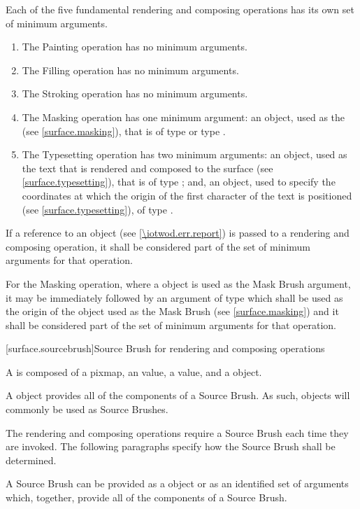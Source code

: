 \pnum
Each of the five fundamental rendering and composing operations has its own set of minimum arguments.
\begin{enumerate}
	\item The Painting operation has no minimum arguments.
	\item The Filling operation has no minimum arguments.
	\item The Stroking operation has no minimum arguments.
	\item The Masking operation has one minimum argument: an object, used as the  (see \ref{surface.masking}), that is of type  or type .
	\item The Typesetting operation has two minimum arguments: an object, used as the text that is rendered and composed to the surface (see \ref{surface.typesetting}), that is of type ; and, an object, used to specify the coordinates at which the origin of the first character of the text is positioned (see \ref{surface.typesetting}), of type .
\end{enumerate}

\pnum
If a reference to an  object (see \ref{\iotwod.err.report}) is passed to a rendering and composing operation, it shall be considered part of the set of minimum arguments for that operation.

\pnum
For the Masking operation, where a  object is used as the Mask Brush argument, it may be immediately followed by an argument of type  which shall be used as the origin of the  object used as the Mask Brush (see \ref{surface.masking}) and it shall be considered part of the set of minimum arguments for that operation.

 [surface.sourcebrush]{Source Brush for rendering and composing operations}

\pnum
A  is composed of a pixmap, an  value, a  value, and a  object.

\pnum
\enternote
A  object provides all of the components of a Source Brush. As such,  objects will commonly be used as Source Brushes.
\exitnote

\pnum
The rendering and composing operations require a Source Brush each time they are invoked. The following paragraphs specify how the Source Brush shall be determined.

\pnum
A Source Brush can be provided as a  object or as an identified set of arguments which, together, provide all of the components of a Source Brush.


